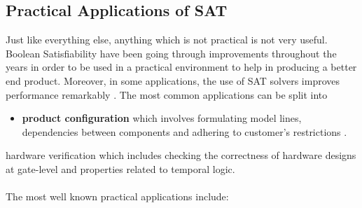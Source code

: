 \documentclass{article}
\begin{document}
			\subsection{Practical Applications of SAT}
			
			Just like everything else, anything which is not practical is not very useful. Boolean Satisfiability have been going through improvements throughout the years in order to be used in a practical environment to help in producing a better end product. Moreover, in some
applications, the use of SAT solvers improves performance remarkably \cite{pa3}. The most common applications can be split into 
\begin{itemize}
\item\textbf{product configuration} which involves formulating model lines,  dependencies between components and adhering to customer's restrictions \cite{pa2}.
\end{itemize}
  hardware verification which includes checking the correctness of hardware designs at gate-level and properties related to temporal logic\cite{pa1}.	\\\\
The most well known practical applications include:
\end{document}
